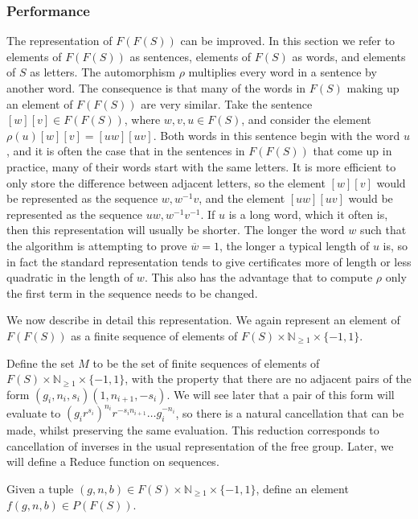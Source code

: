\documentclass[12pt]{article} %
\theoremstyle{definition}
\theoremstyle{definition}
\theoremstyle{definition}
\theoremstyle{definition}
\theoremstyle{definition}
\theoremstyle{definition}
\begin{document}
\subsubsection{Performance}

The representation of $F(F(S))$ can be improved. In this section
we refer to elements of $F(F(S))$ as sentences, elements of $F(S)$ as words,
and elements of $S$ as letters.
 The automorphism $\rho$ multiplies
every word in a sentence by another word. The consequence is that many of the words in
$F(S)$ making up an element of $F(F(S))$ are very similar. Take the sentence $[w][v] \in F(F(S))$,
where $w, v, u \in F(S)$, and consider the element $\rho(u)[w][v] = [uw][uv]$. Both words
in this sentence begin with the word $u$, and it is often the case that in the sentences in $F(F(S))$
that come up in practice, many of their words start with the same letters.
It is more efficient to only store the difference between adjacent letters, so the
element $[w][v]$ would be represented as the sequence $w, w^{-1}v$, and
the element $[uw][uv]$ would be represented as the sequence $uw, w^{-1}v^{-1}$.
If $u$ is a long word, which it often is, then this representation will usually be shorter.
The longer the word $w$ such that the algorithm is attempting
to prove $\overline{w} = 1$, the longer a typical length of $u$ is, so in fact
the standard representation tends to give certificates more of length or less quadratic in
the length of $w$.
This also has the advantage that to compute $\rho$ only the first term in the sequence needs
to be changed.

We now describe in detail this representation. We again
represent an element of $F(F(S))$ as a finite sequence of elements of $F(S) \times \mathbb{N}_{\ge 1}
\times\{-1,1\}$.

Define the set $M$ to be the set of finite sequences of elements of
$F(S) \times \mathbb{N}_{\ge 1}
\times\{-1,1\}$, with the property that there are no adjacent pairs of the form
$(g_i, n_i, s_i)(1, n_{i+1}, -s_i)$. We will see later that a pair of this form will evaluate
to $(g_i r^{s_i})^{n_i}r^{-s_in_{i+1}} \dots g_i^{-n_i}$,
so there is a natural cancellation that can be made, whilst preserving the same
evaluation. This reduction corresponds to cancellation of inverses in
the usual representation of the free group. Later,
we will define a Reduce function on sequences.

Given a tuple $(g, n, b) \in F(S) \times \mathbb{N}_{\ge 1} \times\{-1,1\}$,
define an element $f(g, n, b) \in P(F(S))$.
\end{document}
